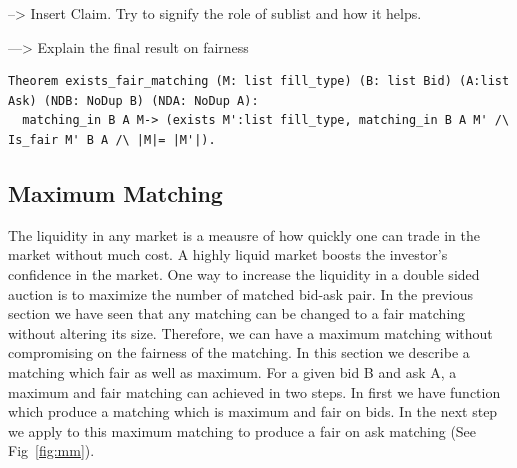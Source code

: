 \documentclass[a4paper,UKenglish,cleveref, autoref]{lipics-v2019}
\begin{document}
--> Insert Claim.
Try to signify the role of sublist and how it helps. 

---> Explain the final result on fairness
\begin{verbatim}
Theorem exists_fair_matching (M: list fill_type) (B: list Bid) (A:list Ask) (NDB: NoDup B) (NDA: NoDup A):
  matching_in B A M-> (exists M':list fill_type, matching_in B A M' /\ Is_fair M' B A /\ |M|= |M'|).
\end{verbatim}


\subsection{Maximum Matching}

The liquidity in any market is a meausre of how quickly one can trade in the market without much cost. A highly liquid market boosts the investor's confidence in the market. One way to increase the liquidity in a double sided auction is to maximize the number of matched bid-ask pair. In the previous section we have seen that any matching can be changed to a fair matching without altering its size. Therefore, we can have a maximum matching without compromising on the fairness of the matching. In this section we describe a matching which fair as well as maximum. For a given bid B and ask A, a maximum and fair matching can achieved in two steps. In first we have function  which produce a matching which is maximum and fair on bids. In the next step we apply  to this maximum matching to produce a fair on ask matching (See Fig~\ref{fig:mm}).
\end{document}
